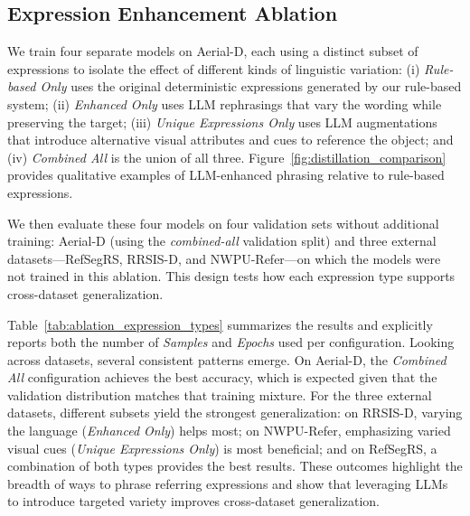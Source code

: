 \subsection{Expression Enhancement Ablation}
\label{subsec:ablation_studies}

We train four separate models on Aerial-D, each using a distinct subset of expressions to isolate the effect of different kinds of linguistic variation: (i) \emph{Rule-based Only} uses the original deterministic expressions generated by our rule-based system; (ii) \emph{Enhanced Only} uses LLM rephrasings that vary the wording while preserving the target; (iii) \emph{Unique Expressions Only} uses LLM augmentations that introduce alternative visual attributes and cues to reference the object; and (iv) \emph{Combined All} is the union of all three. Figure~\ref{fig:distillation_comparison} provides qualitative examples of LLM-enhanced phrasing relative to rule-based expressions.

We then evaluate these four models on four validation sets without additional training: Aerial-D (using the \emph{combined-all} validation split) and three external datasets—RefSegRS, RRSIS-D, and NWPU-Refer—on which the models were not trained in this ablation. This design tests how each expression type supports cross-dataset generalization.

Table~\ref{tab:ablation_expression_types} summarizes the results and explicitly reports both the number of \emph{Samples} and \emph{Epochs} used per configuration. Looking across datasets, several consistent patterns emerge. On Aerial-D, the \emph{Combined All} configuration achieves the best accuracy, which is expected given that the validation distribution matches that training mixture. For the three external datasets, different subsets yield the strongest generalization: on RRSIS-D, varying the language (\emph{Enhanced Only}) helps most; on NWPU-Refer, emphasizing varied visual cues (\emph{Unique Expressions Only}) is most beneficial; and on RefSegRS, a combination of both types provides the best results. These outcomes highlight the breadth of ways to phrase referring expressions and show that leveraging LLMs to introduce targeted variety improves cross-dataset generalization.

